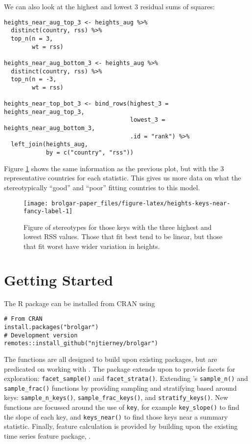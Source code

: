 We can also look at the highest and lowest 3 residual sums of squares:

\begin{verbatim}
heights_near_aug_top_3 <- heights_aug %>% 
  distinct(country, rss) %>% 
  top_n(n = 3,
        wt = rss)

heights_near_aug_bottom_3 <- heights_aug %>% 
  distinct(country, rss) %>% 
  top_n(n = -3,
        wt = rss)

heights_near_top_bot_3 <- bind_rows(highest_3 = heights_near_aug_top_3,
                                    lowest_3 = heights_near_aug_bottom_3,
                                    .id = "rank") %>% 
  left_join(heights_aug,
            by = c("country", "rss"))
\end{verbatim}

Figure \ref{fig:heights-keys-near-fancy-label} shows the same information as the previous plot, but with the 3 representative countries for each statistic. This gives us more data on what the stereotypically ``good'' and ``poor'' fitting countries to this model.

\begin{figure}

{\centering \texttt{[image: brolgar-paper\_files/figure-latex/heights-keys-near-fancy-label-1]} 

}

\caption{Figure of stereotypes for those keys with the three highest and lowest RSS values. Those that fit best tend to be linear, but those that fit worst have wider variation in heights.}\label{fig:heights-keys-near-fancy-label}
\end{figure}

\hypertarget{getting-started}{%
\section{Getting Started}\label{getting-started}}

The  R package can be installed from CRAN using

\begin{verbatim}
# From CRAN
install.packages("brolgar")
# Development version
remotes::install_github("njtierney/brolgar")
\end{verbatim}

The functions are all designed to build upon existing packages, but are predicated on working with . The package extends upon  to provide facets for exploration: \texttt{facet\_sample()} and \texttt{facet\_strata()}. Extending 's \texttt{sample\_n()} and \texttt{sample\_frac()} functions by providing sampling and stratifying based around keys: \texttt{sample\_n\_keys()}, \texttt{sample\_frac\_keys()}, and \texttt{stratify\_keys()}. New functions are focussed around the use of \texttt{key}, for example \texttt{key\_slope()} to find the slope of each key, and \texttt{keys\_near()} to find those keys near a summary statistic. Finally, feature calculation is provided by building upon the existing time series feature package, .

